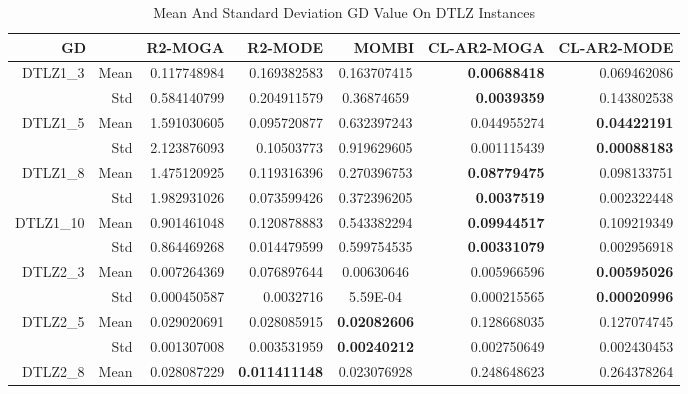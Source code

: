 \begin{table*}[htbp]
  \centering
  \caption{Mean And Standard Deviation GD Value On DTLZ Instances}
    \begin{tabular}{rrrrrrr}
    \toprule
    \multicolumn{2}{c}{GD} & R2-MOGA & R2-MODE & MOMBI & CL-AR2-MOGA & CL-AR2-MODE \\
    \midrule
    \multirow{2}[0]{*}{DTLZ1\_3} & Mean  & 0.117748984 & 0.169382583 & \multicolumn{1}{c}{0.163707415} & \textbf{0.00688418} & 0.069462086 \\
          & Std   & 0.584140799 & 0.204911579 & \multicolumn{1}{c}{0.36874659} & \textbf{0.0039359} & 0.143802538 \\
    \multirow{2}[0]{*}{DTLZ1\_5} & Mean  & 1.591030605 & 0.095720877 & \multicolumn{1}{c}{0.632397243} & 0.044955274 & \textbf{0.04422191} \\
          & Std   & 2.123876093 & 0.10503773 & \multicolumn{1}{c}{0.919629605} & 0.001115439 & \textbf{0.00088183} \\
    \multirow{2}[0]{*}{DTLZ1\_8} & Mean  & 1.475120925 & 0.119316396 & \multicolumn{1}{c}{0.270396753} & \textbf{0.08779475} & 0.098133751 \\
          & Std   & 1.982931026 & 0.073599426 & \multicolumn{1}{c}{0.372396205} & \textbf{0.0037519} & 0.002322448 \\
    \multirow{2}[0]{*}{DTLZ1\_10} & Mean  & 0.901461048 & 0.120878883 & \multicolumn{1}{c}{0.543382294} & \textbf{0.09944517} & 0.109219349 \\
          & Std   & 0.864469268 & 0.014479599 & \multicolumn{1}{c}{0.599754535} & \textbf{0.00331079} & 0.002956918 \\
    \multirow{2}[0]{*}{DTLZ2\_3} & Mean  & 0.007264369 & 0.076897644 & \multicolumn{1}{c}{0.00630646} & 0.005966596 & \textbf{0.00595026} \\
          & Std   & 0.000450587 & 0.0032716 & \multicolumn{1}{c}{5.59E-04} & 0.000215565 & \textbf{0.00020996} \\
    \multirow{2}[0]{*}{DTLZ2\_5} & Mean  & 0.029020691 & 0.028085915 & \multicolumn{1}{c}{\textbf{0.02082606}} & 0.128668035 & 0.127074745 \\
          & Std   & 0.001307008 & 0.003531959 & \multicolumn{1}{c}{\textbf{0.00240212}} & 0.002750649 & 0.002430453 \\
    \multirow{2}[0]{*}{DTLZ2\_8} & Mean  & 0.028087229 & \textbf{0.011411148} & \multicolumn{1}{c}{0.023076928} & 0.248648623 & 0.264378264 \\

\end{tabular}
\end{table*}
